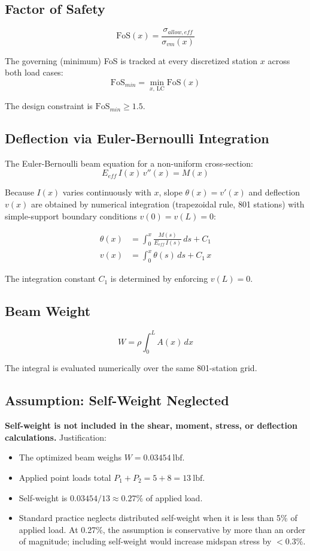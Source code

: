 \documentclass[11pt,letterpaper]{article}
\begin{document}
\subsection{Factor of Safety}

\[
  \mathrm{FoS}(x) = \frac{\sigma_{allow,eff}}{\sigma_{vm}(x)}
\]

The governing (minimum) FoS is tracked at every discretized station $x$
across both load cases:
\[
  \mathrm{FoS}_{min} = \min_{x,\,\text{LC}} \mathrm{FoS}(x)
\]

The design constraint is $\mathrm{FoS}_{min} \ge 1.5$.

\subsection{Deflection via Euler-Bernoulli Integration}

The Euler-Bernoulli beam equation for a non-uniform cross-section:
\[
  E_{eff}\,I(x)\,v''(x) = M(x)
\]

Because $I(x)$ varies continuously with $x$, slope $\theta(x) = v'(x)$
and deflection $v(x)$ are obtained by numerical integration (trapezoidal rule,
801 stations) with simple-support boundary conditions $v(0) = v(L) = 0$:

\begin{align*}
  \theta(x) &= \int_0^x \frac{M(s)}{E_{eff}\,I(s)}\,ds + C_1 \\
  v(x) &= \int_0^x \theta(s)\,ds + C_1\,x
\end{align*}

The integration constant $C_1$ is determined by enforcing $v(L) = 0$.

\subsection{Beam Weight}

\[
  W = \rho \int_0^{L} A(x)\,dx
\]

The integral is evaluated numerically over the same 801-station grid.

\subsection{Assumption: Self-Weight Neglected}

\textbf{Self-weight is not included in the shear, moment, stress, or
deflection calculations.}  Justification:

\begin{itemize}[noitemsep]
  \item The optimized beam weighs $W = 0.03454\ \mathrm{lbf}$.
  \item Applied point loads total $P_1 + P_2 = 5 + 8 = 13\ \mathrm{lbf}$.
  \item Self-weight is $0.03454 / 13 \approx 0.27\%$ of applied load.
  \item Standard practice neglects distributed self-weight when it is less
    than 5\% of applied load.  At 0.27\%, the assumption is conservative
    by more than an order of magnitude; including self-weight would increase
    midspan stress by $< 0.3\%$.
\end{itemize}
\end{document}
